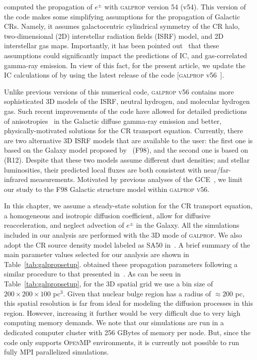\documentclass[doublespace,nopageskip]{VTthesis} %
\begin{document}
\citet{Song:2019nrx} computed the propagation of $e^{\pm}$ with \textsc{galprop} version 54 (v54). This version of the code makes some simplifying assumptions for the propagation of Galactic CRs. Namely, it  assumes galactocentric cylindrical symmetry of the CR halo, two-dimensional (2D) interstellar radiation fields (ISRF) model, and 2D interstellar gas maps. Importantly, it has been pointed out~\citep{Porter:2017vaa,Johannesson:2018bit} that these assumptions could significantly impact the predictions of IC, and gas-correlated gamma-ray emission. In view of this fact, for the present article, we update the IC calculations of \citet{Song:2019nrx} by using the latest release of the code [\textsc{galprop} v56~\citep{Porter:2017vaa,Johannesson:2018bit}].    

Unlike previous versions of this numerical code, \textsc{galprop v56}  contains more sophisticated 3D models of the ISRF, 
neutral hydrogen, and molecular hydrogen gas. Such recent improvements of the code have allowed for detailed predictions of anisotropies~\citep{Porter:2017vaa,Johannesson:2018bit} in the Galactic diffuse gamma-ray emission and better, physically-motivated solutions for the CR transport equation.
%
Currently, there are two alternative 3D ISRF models that are available to the user: the first one is based on the Galaxy model proposed by~\cite{Freudenreich:1998} (F98), and the second one is based on~\cite{R12} (R12). Despite that these two models assume different dust densities; and stellar luminosities, their predicted local fluxes are both consistent with near/far-infrared measurements. Motivated by previous analyses of the GCE~\citep{Macias:2016nev,Bartels:2017vsx,Macias:2019omb}, we limit our study to the F98 Galactic structure model within \textsc{galprop v56}.

In this chapter, we assume a steady-state solution for the CR transport equation, a homogeneous and isotropic diffusion coefficient, allow for diffusive reacceleration,  and neglect advection of $e^\pm$ in the Galaxy. All the simulations included in our analysis are performed with the 3D mode of \textsc{galprop}. We also adopt the CR source density model labeled as SA50 in~\cite{Johannesson:2018bit}.  A brief summary of the main parameter values selected for our analysis are shown in Table~\ref{tab:galpropsetup}. \cite{Johannesson:2018bit} obtained these propagation parameters following a similar procedure to that presented in~\cite{Porter:2017vaa}. As can be seen in Table~\ref{tab:galpropsetup}, for the 3D spatial grid we use a bin size of $200\times200\times100$ pc$^3$. Given that nuclear bulge region has a radius of $\approx 200$ pc, this spatial resolution is far from ideal for modeling the diffusion processes in this region. However, increasing it further would be very difficult due to very high computing memory demands. We note that our simulations are run in a dedicated computer cluster with 256 GBytes of memory per node. But, since the code only supports \textsc{OpenMP} environments, it is currently not possible to run fully \textsc{MPI} parallelized simulations.  
\end{document}
